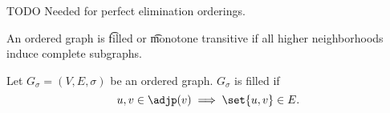 
\sbasic

















\sstart
{}


TODO
Needed for perfect elimination orderings.


An ordered graph is \t{filled} or \t{monotone transitive} if all higher neighborhoods induce complete subgraphs.


Let $G_{\sigma} = (V, E, \sigma)$ be an ordered graph.
$G_{\sigma}$ is filled if
$$
  u, v \in \adjp(v) \implies \set{u, v} \in E.
$$
\strats
